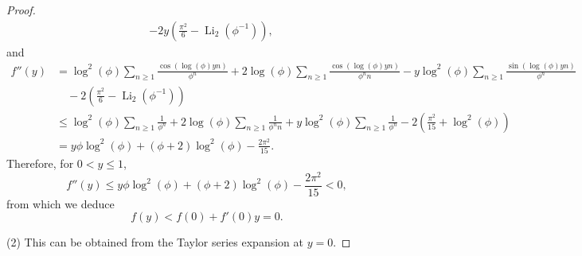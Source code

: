 \documentclass[11pt,reqno]{amsart}
\theoremstyle{remark}
\numberwithin{equation}{section}
\def\Li{\operatorname{Li}}
\def\Li{\operatorname{Li}}
\begin{document}
\begin{proof}
\begin{align*}
	& -2 y \left( \frac{\pi^2}{6}- \Li_2 (\phi^{-1})  \right),
\end{align*}
and 
\begin{align*}
	f''(y) &= \log^2(\phi) \sum_{n \ge 1} \frac{ \cos \left( \log(\phi) y n\right)}{\phi^n} +2\log(\phi)\sum_{n \ge 1} \frac{ \cos \left( \log(\phi) y n \right)}{\phi^n n} - y \log^2(\phi) \sum_{n \ge 1} \frac{ \sin \left( \log(\phi) y n \right)}{\phi^n} \\
	&\quad -2 \left( \frac{\pi^2}{6}- \Li_2 (\phi^{-1})  \right)\\
	& \leq  \log^2(\phi) \sum_{n \ge 1} \frac{1}{\phi^n} + 2\log(\phi) \sum_{n \ge 1} \frac{1}{\phi^n n} + y \log^2(\phi)\sum_{n \ge 1}\frac{1}{\phi^n} -2 \left( \frac{\pi^2}{15}+ \log^2 (\phi)  \right) \\
	& = y \phi\log^2(\phi) + (\phi+2) \log^2(\phi)  -\frac{2\pi^2}{15}.
\end{align*}
Therefore, for $0 < y \leq 1$,
\[
	f''(y)  \leq y \phi\log^2(\phi) + (\phi+2) \log^2(\phi)  -\frac{2\pi^2}{15} < 0, 
\]
from which we deduce
\[
	f(y) < f(0) + f'(0) y =0.
\]

(2) This can be obtained from the Taylor series expansion at $y=0$.
\end{proof}
\end{document}
